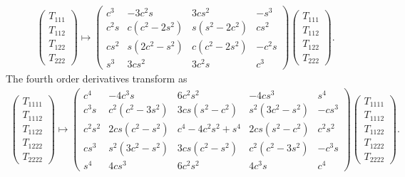 \documentclass[a4paper, 11pt]{article}
\begin{document}
\begin{align}
\begin{pmatrix} T_{111} \\ T_{112} \\ T_{122}\\ T_{222} \end{pmatrix}
\mapsto
\begin{pmatrix}
c^3   & -3 c^2 s        & 3 c s^2          & -s^3   \\
c^2 s &  c(c^2 - 2 s^2) & s( s^2- 2 c^2)   &  c s^2 \\
c s^2 &  s(2 c^2 - s^2) & c(c^2 -  2 s^2)  & -c^2 s \\
s^3   &  3 c s^2        & 3 c^2 s          & c^3 
\end{pmatrix}
\begin{pmatrix} T_{111} \\ T_{112} \\ T_{122}\\ T_{222} \end{pmatrix}.
\end{align}
The fourth order derivatives transform as
\begin{align}
\begin{pmatrix} T_{1111} \\ T_{1112} \\ T_{1122}\\ T_{1222} \\ T_{2222} \end{pmatrix}
\mapsto
\begin{pmatrix}
c^4     & -4 c^3 s          & 6 c^2 s^2               &- 4 c s^3          &  s^4     \\
c^3 s   & c^2(c^2 - 3 s^2)  & 3cs(s^2 - c^2)     & s^2(3 c^2  - s^2) & -c s^3   \\
c^2 s^2 & 2cs( c^2 -  s^2)  & c^4  - 4 c^2 s^2  + s^4 & 2cs(  s^2 -  c^2) &  c^2 s^2 \\
c s^3   & s^2(3 c^2  - s^2) & 3cs( c^2 - s^2 )   & c^2(c^2  - 3 s^2) & -c^3 s   \\
s^4     & 4cs^3             & 6 c^2 s^2               & 4 c^3 s           &  c^4 
\end{pmatrix}
\begin{pmatrix} T_{1111} \\ T_{1112} \\ T_{1122}\\ T_{1222} \\ T_{2222} \end{pmatrix}.
\end{align}
\end{document}

